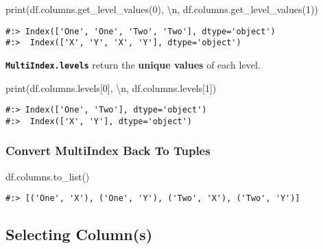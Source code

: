 \documentclass[
]{book}
\newenvironment{Shaded}{\begin{snugshade}}{\end{snugshade}}
\newcommand{\BuiltInTok}[1]{#1}
\newcommand{\CharTok}[1]{\textcolor[rgb]{0.5,0.5,0.5}{#1}}
\newcommand{\DecValTok}[1]{\textcolor[rgb]{0.06,0.06,0.06}{#1}}
\newcommand{\NormalTok}[1]{#1}
\newcommand{\StringTok}[1]{\textcolor[rgb]{0.5,0.5,0.5}{#1}}
\begin{document}
\begin{Shaded}
\begin{Highlighting}[]
\BuiltInTok{print}\NormalTok{(df.columns.get\_level\_values(}\DecValTok{0}\NormalTok{), }\StringTok{\textquotesingle{}}\CharTok{\textbackslash{}n}\StringTok{\textquotesingle{}}\NormalTok{,}
\NormalTok{      df.columns.get\_level\_values(}\DecValTok{1}\NormalTok{))}
\end{Highlighting}
\end{Shaded}

\begin{verbatim}
#:> Index(['One', 'One', 'Two', 'Two'], dtype='object') 
#:>  Index(['X', 'Y', 'X', 'Y'], dtype='object')
\end{verbatim}

\textbf{\texttt{MultiIndex.levels}} return the \textbf{unique values} of each level.

\begin{Shaded}
\begin{Highlighting}[]
\BuiltInTok{print}\NormalTok{(df.columns.levels[}\DecValTok{0}\NormalTok{], }\StringTok{\textquotesingle{}}\CharTok{\textbackslash{}n}\StringTok{\textquotesingle{}}\NormalTok{,}
\NormalTok{      df.columns.levels[}\DecValTok{1}\NormalTok{])}
\end{Highlighting}
\end{Shaded}

\begin{verbatim}
#:> Index(['One', 'Two'], dtype='object') 
#:>  Index(['X', 'Y'], dtype='object')
\end{verbatim}

\hypertarget{convert-multiindex-back-to-tuples}{%
\subsubsection{Convert MultiIndex Back To Tuples}\label{convert-multiindex-back-to-tuples}}

\begin{Shaded}
\begin{Highlighting}[]
\NormalTok{df.columns.to\_list()}
\end{Highlighting}
\end{Shaded}

\begin{verbatim}
#:> [('One', 'X'), ('One', 'Y'), ('Two', 'X'), ('Two', 'Y')]
\end{verbatim}

\hypertarget{selecting-columns}{%
\subsection{Selecting Column(s)}\label{selecting-columns}}
\end{document}
